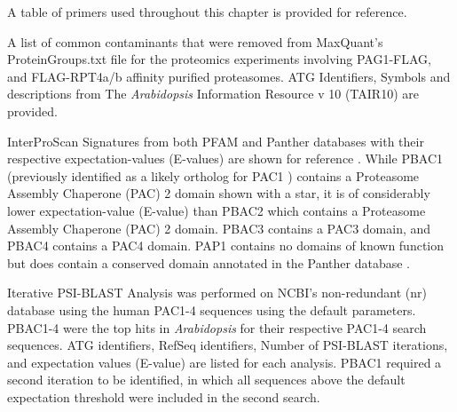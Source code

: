 \begin{table}
	\centering
	{A table of primers used throughout this chapter is provided for reference.}
\begingroup
\let\clearpage\relax
\scalebox{0.7}{

}
\endgroup
\npnoround
\label{table:primers}
\end{table}
\clearpage

\begin{table}[h]
	\centering
	{A list of common contaminants that were removed from MaxQuant’s ProteinGroups.txt file for the proteomics experiments involving PAG1-FLAG, and FLAG-RPT4a/b affinity purified proteasomes.  ATG Identifiers, Symbols and descriptions from The \textit{Arabidopsis} Information Resource v 10 (TAIR10) are provided.}
\begingroup
\let\clearpage\relax
\scalebox{1}{

}
\endgroup
\npnoround
\label{table:contam}
\end{table}
\clearpage

\begin{table}
	\centering
	{InterProScan Signatures from both PFAM and Panther databases with their respective expectation-values (E-values) are shown for reference \citep{jones14}. While PBAC1 (previously identified as a likely ortholog for PAC1 \citep{kusmierczyk11}) contains a Proteasome Assembly Chaperone (PAC) 2 domain shown with a star, it is of considerably lower expectation-value (E-value) than PBAC2 which contains a Proteasome Assembly Chaperone (PAC) 2 domain. PBAC3 contains a PAC3 domain, and PBAC4 contains a PAC4 domain. PAP1 contains no domains of known function but does contain a conserved domain annotated in the Panther database \citep{mi05}.}
\begingroup
\let\clearpage\relax
\scalebox{0.7}{

}
\endgroup
\npnoround
\label{table:ipro}
\end{table}
\clearpage

\begin{table}[h]
	\centering
	{Iterative PSI-BLAST Analysis was performed on NCBI’s non-redundant (nr) database using the human PAC1-4 sequences using the default parameters. PBAC1-4 were the top hits in \textit{Arabidopsis} for their respective PAC1-4 search sequences. ATG identifiers, RefSeq identifiers, Number of PSI-BLAST iterations, and expectation values (E-value) are listed for each analysis. PBAC1 required a second iteration to be identified, in which all sequences above the default expectation threshold were included in the second search.}
\begingroup
\let\clearpage\relax
\scalebox{1}{

}
\endgroup
\npnoround
\label{table:psiblast}
\end{table}
\clearpage

